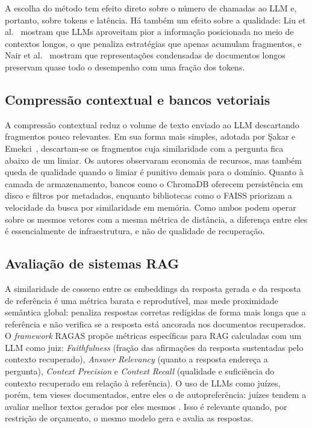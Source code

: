 A escolha do método tem efeito direto sobre o número de chamadas ao LLM e, portanto, sobre tokens e latência. Há também um efeito sobre a qualidade: Liu et al.~\cite{liu2023lost} mostram que LLMs aproveitam pior a informação posicionada no meio de contextos longos, o que penaliza estratégias que apenas acumulam fragmentos, e Nair et al.~\cite{nair2023drilling} mostram que representações condensadas de documentos longos preservam quase todo o desempenho com uma fração dos tokens.

\subsection{Compressão contextual e bancos vetoriais}

A compressão contextual reduz o volume de texto enviado ao LLM descartando fragmentos pouco relevantes. Em sua forma mais simples, adotada por Şakar e Emekci~\cite{sakar2025rag}, descartam-se os fragmentos cuja similaridade com a pergunta fica abaixo de um limiar. Os autores observaram economia de recursos, mas também queda de qualidade quando o limiar é punitivo demais para o domínio. Quanto à camada de armazenamento, bancos como o ChromaDB oferecem persistência em disco e filtros por metadados, enquanto bibliotecas como o FAISS \cite{johnson2021faiss} priorizam a velocidade da busca por similaridade em memória. Como ambos podem operar sobre os mesmos vetores com a mesma métrica de distância, a diferença entre eles é essencialmente de infraestrutura, e não de qualidade de recuperação.

\subsection{Avaliação de sistemas RAG}

A similaridade de cosseno entre os embeddings da resposta gerada e da resposta de referência é uma métrica barata e reprodutível, mas mede proximidade semântica global: penaliza respostas corretas redigidas de forma mais longa que a referência e não verifica se a resposta está ancorada nos documentos recuperados. O \emph{framework} RAGAS \cite{es2024ragas} propõe métricas específicas para RAG calculadas com um LLM como juiz: \emph{Faithfulness} (fração das afirmações da resposta sustentadas pelo contexto recuperado), \emph{Answer Relevancy} (quanto a resposta endereça a pergunta), \emph{Context Precision} e \emph{Context Recall} (qualidade e suficiência do contexto recuperado em relação à referência). O uso de LLMs como juízes, porém, tem vieses documentados, entre eles o de autopreferência: juízes tendem a avaliar melhor textos gerados por eles mesmos \cite{zheng2023judging, panickssery2024selfpref}. Isso é relevante quando, por restrição de orçamento, o mesmo modelo gera e avalia as respostas.

